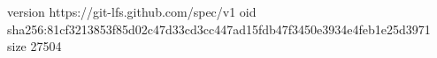 version https://git-lfs.github.com/spec/v1
oid sha256:81cf3213853f85d02c47d33cd3cc447ad15fdb47f3450e3934e4feb1e25d3971
size 27504
